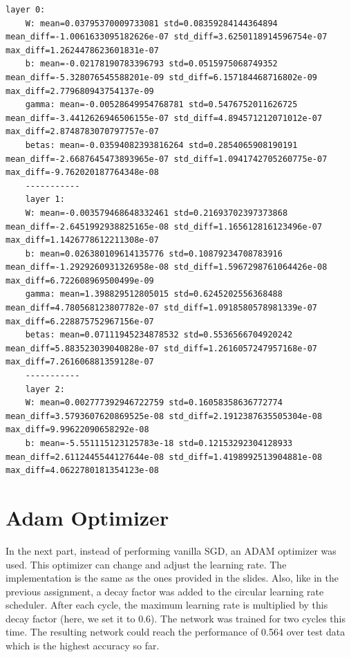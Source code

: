 \documentclass[a4paper]{article}
\begin{document}
\begin{lstlisting}[label={lst:gradient}]
	layer 0:
	W: mean=0.03795370009733081 std=0.08359284144364894 mean_diff=-1.0061633095182626e-07 std_diff=3.6250118914596754e-07 max_diff=1.2624478623601831e-07
	b: mean=-0.02178190783396793 std=0.0515975068749352 mean_diff=-5.328076545588201e-09 std_diff=6.157184468716802e-09 max_diff=2.779680943754137e-09
	gamma: mean=-0.00528649954768781 std=0.5476752011626725 mean_diff=-3.4412626946506155e-07 std_diff=4.894571212071012e-07 max_diff=2.8748783070797757e-07
	betas: mean=-0.03594082393816264 std=0.2854065908190191 mean_diff=-2.6687645473893965e-07 std_diff=1.0941742705260775e-07 max_diff=-9.762020187764348e-08
	-----------
	layer 1:
	W: mean=-0.003579468648332461 std=0.21693702397373868 mean_diff=-2.6451992938825165e-08 std_diff=1.165612816123496e-07 max_diff=1.1426778612211308e-07
	b: mean=0.026380109614135776 std=0.10879234708783916 mean_diff=-1.2929260931326958e-08 std_diff=1.5967298761064426e-08 max_diff=6.722608969500499e-09
	gamma: mean=1.398829512805015 std=0.6245202556368488 mean_diff=4.780568123807782e-07 std_diff=1.0918580578981339e-07 max_diff=6.228875752967156e-07
	betas: mean=0.07111945234878532 std=0.5536566704920242 mean_diff=5.883523039040828e-07 std_diff=1.2616057247957168e-07 max_diff=7.261606881359128e-07
	-----------
	layer 2:
	W: mean=0.002777392946722759 std=0.16058358636772774 mean_diff=3.5793607620869525e-08 std_diff=2.1912387635505304e-08 max_diff=9.99622090658292e-08
	b: mean=-5.551115123125783e-18 std=0.12153292304128933 mean_diff=2.6112445544127644e-08 std_diff=1.4198992513904881e-08 max_diff=4.0622780181354123e-08
\end{lstlisting}


\section{Adam Optimizer}

In the next part, instead of performing vanilla SGD, an ADAM optimizer was used. This optimizer can change and adjust the learning rate. The implementation is the same as the ones provided in the slides. Also, like in the previous assignment, a decay factor was added to the circular learning rate scheduler. After each cycle, the maximum learning rate is multiplied by this decay factor (here, we set it to 0.6). The network was trained for two cycles this time. The resulting network could reach the performance of 0.564 over test data which is the highest accuracy so far.
\end{document}
